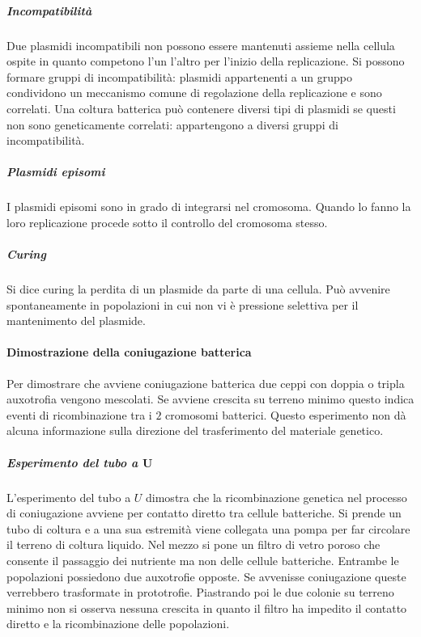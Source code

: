 				\subparagraph{Incompatibilit\`a}
				Due plasmidi incompatibili non possono essere mantenuti assieme nella cellula ospite in quanto competono l'un l'altro per l'inizio della replicazione. 
				Si possono formare gruppi di incompatibilit\`a: plasmidi appartenenti a un gruppo condividono un meccanismo comune di regolazione della replicazione e sono correlati.
				Una coltura batterica pu\`o contenere diversi tipi di plasmidi se questi non sono geneticamente correlati: appartengono a diversi gruppi di incompatibilit\`a.

				\subparagraph{Plasmidi episomi}
				I plasmidi episomi sono in grado di integrarsi nel cromosoma.
				Quando lo fanno la loro replicazione procede sotto il controllo del cromosoma stesso.

				\subparagraph{Curing}
				Si dice curing la perdita di un plasmide da parte di una cellula.
				Pu\`o avvenire spontaneamente in popolazioni in cui non vi \`e pressione selettiva per il mantenimento del plasmide.

			\paragraph{Dimostrazione della coniugazione batterica}
			Per dimostrare che avviene coniugazione batterica due ceppi con doppia o tripla auxotrofia vengono mescolati. 
			Se avviene crescita su terreno minimo questo indica eventi di ricombinazione tra i $2$ cromosomi batterici.
			Questo esperimento non dà alcuna informazione sulla direzione del trasferimento del materiale genetico.

				\subparagraph{Esperimento del tubo a $\mathbf{U}$}
				L'esperimento del tubo a $U$ dimostra che la ricombinazione genetica nel processo di coniugazione avviene per contatto diretto tra cellule batteriche.
				Si prende un tubo di coltura e a una sua estremit\`a viene collegata una pompa per far circolare il terreno di coltura liquido.
				Nel mezzo si pone un filtro di vetro poroso che consente il passaggio dei nutriente ma non delle cellule batteriche.
				Entrambe le popolazioni possiedono due auxotrofie opposte.
				Se avvenisse coniugazione queste verrebbero trasformate in prototrofie.
				Piastrando poi le due colonie su terreno minimo non si osserva nessuna crescita in quanto il filtro ha impedito il contatto diretto e la ricombinazione delle popolazioni.

